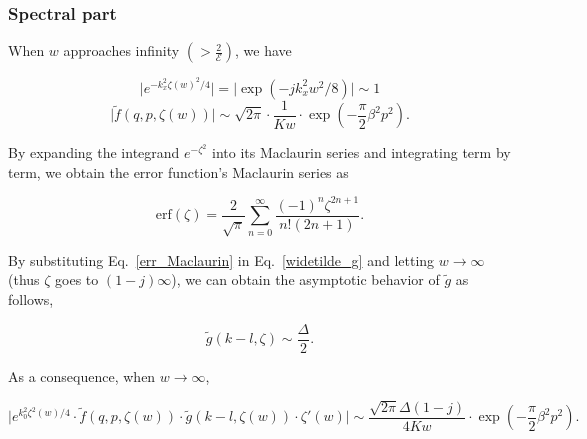 \documentclass[preprint,12pt]{elsarticle}
\begin{document}
 \subsubsection{Spectral part}
 When $w$ approaches infinity $(> \frac{2}{\mathcal{E}})$, we have
 \begin{small}
 \begin{equation}
  \big| e^{-k^2_x\zeta(w)^2/4} \big|  = \big | \exp \left( -j k^2_x w^2/8 \right) \big| \sim 1
 \end{equation}
 \begin{equation}
 \big| \widetilde{f}(q, p, \zeta(w))  \big| \sim 
 \sqrt{2\pi}\cdot \frac{1}{Kw} \cdot \exp\left( -\frac{\pi}{2}\beta^2 p^2 \right).
 \end{equation}
\end{small}
By expanding the integrand $e^{-\zeta^2}$ into its Maclaurin series and integrating term by term, we obtain the error function's Maclaurin series as
\begin{small}
\begin{equation}
\text{erf}(\zeta) = \frac{2}{\sqrt{\pi}} \sum^{\infty}_{n=0} \frac{(-1)^n \zeta^{2n+1}}{n!(2n+1)}.
\label{err_Maclaurin}
\end{equation}
\end{small}
By substituting Eq.~\eqref{err_Maclaurin} {in} Eq.~\eqref{widetilde_g} and letting $w\rightarrow \infty$ (thus $\zeta$ {goes  to $(1-j)\infty$}), we can obtain the asymptotic behavior of $\widetilde{g}$ as follows,
\begin{small}
\begin{equation}
\widetilde{g}(k-l,\zeta) \sim \frac{\Delta}{2}.
\end{equation}
\end{small}

 As a consequence, when $w \rightarrow \infty$,
 \begin{small}
 \begin{equation}
 \big|  e^{k_0^2\zeta^2(w)/4} \cdot \widetilde{f}(q,p,\zeta(w)) \cdot \widetilde{g}(k-l,\zeta(w)) \cdot \zeta'(w) \big|
 \sim
 \frac{\sqrt{2\pi}\Delta (1 -j)}{4Kw} \cdot \exp \left( -\frac{\pi}{2}\beta^2 p^2\right) .
 \label{limit_spectral}
 \end{equation}
 \end{small}
\end{document}
